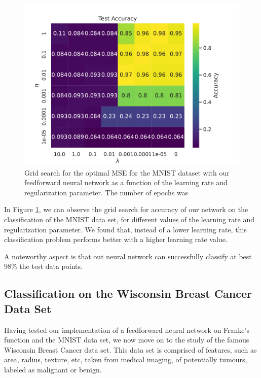 \documentclass[aps,reprint,superscriptaddress,nofootinbib]{revtex4-2}
\begin{document}
\begin{figure}[htp]
    \centering
    \includegraphics[width=\linewidth]{part_d/1_grid_search_mnist.pdf}
    \caption{Grid search for the optimal MSE for the MNIST dataset with our feedforward neural network as a function of the learning rate and regularization parameter. The number of epochs was }
    \label{fig:gs_mnist}
\end{figure}

In Figure \ref{fig:gs_mnist}, we can observe the grid search for accuracy of our network on the classification of the MNIST data set, for different values of the learning rate and regularization parameter. We found that, instead of a lower learning rate, this classification problem performs better with a higher learning rate value. 

A noteworthy aspect is that out neural network can successfully classify at best \(98\%\) the test data points.

\subsection*{Classification on the Wisconsin Breast Cancer Data Set}

Having tested our implementation of a feedforward neural network on Franke's function and the MNIST data set, we now move on to the study of the famous Wisconsin Breast Cancer data set. This data set is comprised of features, such as area, radius, texture, etc, taken from medical imaging, of potentially tumours, labeled as malignant or benign.
\end{document}
